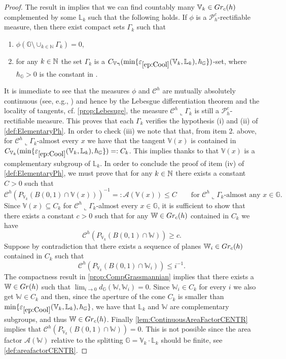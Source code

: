 \documentclass[10pt, a4paper,
oneside, headinclude,footinclude]{scrartcl}
\begin{document}
\begin{proof}
The result in \cite[Theorem 3.4]{antonelli2020rectifiable} implies that we can find countably many $\mathbb{V}_k\in Gr_c(h)$ complemented by some $\mathbb L_k$ such that the following holds. If $\phi$ is a $\mathscr{P}_h^c$-rectifiable measure, then there exist compact sets $\Gamma_k$ such that
\begin{enumerate}
\item $\phi(\mathbb G\setminus \cup_{k\in\mathbb N}\Gamma_k)=0$,
    \item for any $k\in\mathbb{N}$ the set $\Gamma_k$ is a $C_\mathbb{V_k}(\min\{\oldep{ep:Cool}(\mathbb{V}_k,\mathbb{L}_k),\hbar_\mathbb{G}\})$-set, where $\hbar_\mathbb{G}>0$ is the constant in \cite[Proposition 2.8]{antonelli2020rectifiable}.
\end{enumerate}
It is immediate to see that the measures $\phi$ and $\mathcal{C}^h$ are mutually absolutely continuous (see, e.g., \cite[Proposition 2.6]{antonelli2020rectifiable}) and hence by the Lebesgue differentiation theorem and the locality of tangents, cf. \cref{prop:Lebesuge}, the measure $\mathcal{C}^h\llcorner\Gamma_k$ is still a $\mathscr{P}_h^c$-rectifiable measure. This proves that each $\Gamma_k$ verifies the hypothesis (i) and (ii) of \cref{def:ElementaryPh}. In order to check (iii) we note that that, from item 2. above, for $\mathcal{C}^h\llcorner \Gamma_k$-almost every $x$ we have that the tangent $\mathbb{V}(x)$ is contained in $ C_{\mathbb{V}_k}(\min\{\oldep{ep:Cool}(\mathbb{V}_k,\mathbb{L}_k),\hbar_\mathbb{G}\})=:C_k$. This implies thanks to \cite[Proof of Proposition 2.17]{antonelli2020rectifiable} that $\mathbb{V}(x)$ is a complementary subgroup of $\mathbb{L}_k$. In order to conclude the proof of item (iv) of \cref{def:ElementaryPh}, we must prove that for any $k\in\mathbb{N}$ there exists a constant $C>0$ such that
$$\mathcal{C}^h(P_{\mathbb V_k}(B(0,1)\cap\mathbb V(x)))^{-1}=:\mathcal{A}(\mathbb{V}(x))\leq C\qquad \text{for }\mathcal{C}^h\llcorner \Gamma_k\text{-almost any }x\in \mathbb{G}.$$
Since $\mathbb V(x)\subseteq C_k$ for $\mathcal{C}^h\llcorner\Gamma_k$-almost every $x\in\mathbb G$, it is sufficient to show that there exists a constant $c>0$ such that for any $\mathbb{W}\in Gr_c(h)$ contained in $C_k$ we have
$$\mathcal{C}^h(P_{\mathbb V_k}(B(0,1)\cap\mathbb W))\geq c.$$
Suppose by contradiction that there exists a sequence of planes $\mathbb{W}_i\in Gr_c(h)$ contained in $C_k$ such that
$$\mathcal{C}^h(P_{\mathbb V_k}(B(0,1)\cap\mathbb W_i))\leq i^{-1}.$$
The compactness result in \cref{prop:CompGrassmannian} implies that there exists a $\mathbb{W}\in Gr(h)$ such that $\lim_{i\to 0}d_{\mathbb{G}}(\mathbb{W},\mathbb{W}_i)=0$. Since $\mathbb W_i\in C_k$ for every $i$ we also get $\mathbb W\in C_k$ and then, since the aperture of the cone $C_k$ is smaller than $\min\{\oldep{ep:Cool}(\mathbb{V}_k,\mathbb{L}_k),\hbar_\mathbb{G}\}$, \cite[Proof of Proposition 2.17]{antonelli2020rectifiable} we have that $\mathbb{L}_k$ and $\mathbb{W}$ are complementary subgroups, and thus $\mathbb W\in Gr_c(h)$. Finally \cref{lem:ContinuousAreaFactorCENTR} implies that $\mathcal{C}^h(P_{\mathbb V_k}(B(0,1)\cap\mathbb W))=0$. This is not possible since the area factor $\mathcal{A}(\mathbb W)$ relative to the splitting $\mathbb G=\mathbb V_k\cdot\mathbb L_k$ should be finite, see \cref{def:areafactorCENTR}.

\end{proof}
\end{document}
